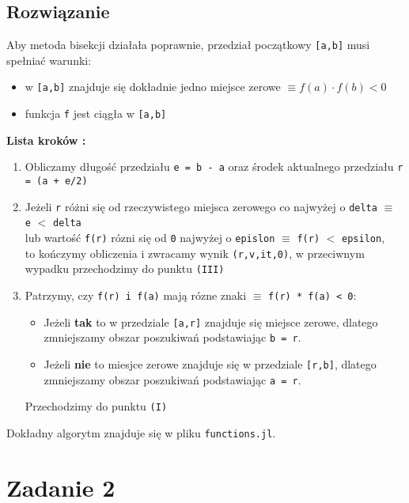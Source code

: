 \documentclass[a4paper]{article}
\begin{document}
    \subsection{Rozwiązanie}
    Aby metoda bisekcji działała poprawnie, przedział początkowy \texttt{[a,b]} musi spełniać warunki:
    \begin{itemize}
        \item w \texttt{[a,b]} znajduje się dokładnie jedno miejsce zerowe $\equiv f(a) \cdot f(b) < 0$
        \item funkcja \texttt{f} jest ciągła w \texttt{[a,b]}
    \end{itemize}
    \textbf{Lista kroków :}
    \begin{enumerate}[I]
        \item Obliczamy długość przedziału \texttt{e = b - a} oraz środek aktualnego przedziału \texttt{r = (a + e/2)}
        \item Jeżeli \texttt{r} różni się od rzeczywistego miejsca zerowego co najwyżej o \texttt{delta}  $ \equiv $ \texttt{e} $<$ \texttt{delta} \\
              lub wartość \texttt{f(r)} rózni się od \texttt{0} najwyżej o \texttt{epislon} $\equiv$ \texttt{f(r)} $ < $ \texttt{epsilon}, \\
              to kończymy obliczenia i zwracamy wynik \texttt{(r,v,it,0)}, w przeciwnym wypadku przechodzimy do punktu \texttt{(III)}
        \item Patrzymy, czy \texttt{f(r) i f(a)} mają rózne znaki $\equiv$ \texttt{f(r) * f(a) < 0}:
            \begin{itemize}
                \item Jeżeli \textbf{tak} to w przedziale \texttt{[a,r]} znajduje się miejsce zerowe, dlatego zmniejszamy obszar poszukiwań podstawiając \texttt{b = r}.
                \item Jeżeli \textbf{nie} to miesjce zerowe znajduje się w przedziale \texttt{[r,b]}, dlatego zmniejszamy obszar poszukiwań podstawiając \texttt{a = r}.
            \end{itemize}
            Przechodzimy do punktu \texttt{(I)}\\
    \end{enumerate}
    Dokładny algorytm znajduje się w pliku \texttt{functions.jl}.  

\section{Zadanie 2}
\end{document}
